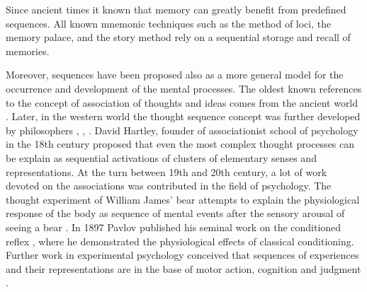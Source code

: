 
  Since ancient times it known that memory can greatly benefit from predefined
  sequences. All known mnemonic techniques such as the method of loci, the
  memory palace, and the story method rely on a sequential storage and recall
  of memories.

  Moreover, sequences have been proposed also as a more general model for the
  occurrence and development of the mental processes. The oldest known
  references to the concept of association of thoughts and ideas comes from the
  ancient world \cite{Plato:Phaedo, Aristotle:demomoria}. Later, in the western
  world the thought sequence concept was further developed by philosophers
  \cite{Hobbes}, \cite{Locke}, \cite{Hume} \cite{Stewart}. David Hartley,
  founder of associationist school of psychology in the 18th century proposed
  that even the most complex thought processes can be explain as sequential
  activations of clusters of elementary senses and representations. At the turn
  between 19th and 20th century, a lot of work devoted on the associations was
  contributed in the field of psychology. The thought experiment of William
  James' bear attempts to explain the physiological response of the body as
  sequence of mental events after the sensory arousal of seeing a bear
  \cite{James1854}. In 1897 Pavlov published his seminal work on the
  conditioned reflex \cite{Pavlov}, where he demonstrated the physiological
  effects of classical conditioning. Further work in experimental psychology
  conceived that sequences of experiences and their representations are in the
  base of motor action, cognition and judgment \cite{Watt1904, Titchener1905,
  Washburn1916}.

